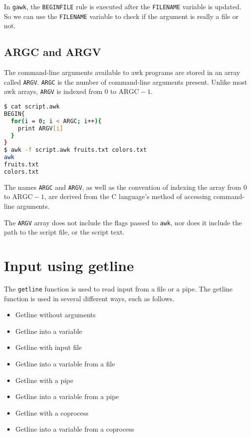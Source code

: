 In \lstinline|gawk|, the \lstinline|BEGINFILE| rule is executed after the \lstinline|FILENAME| variable is updated.
So we can use the \lstinline|FILENAME| variable to check if the argument is really a file or not.

\subsection{ARGC and ARGV}

The command-line arguments available to awk programs are stored in an array called \lstinline|ARGV|.
\lstinline|ARGC| is the number of command-line arguments present.
Unlike most awk arrays, \lstinline|ARGV| is indexed from $0$ to $\text{ARGC} - 1$.

\begin{lstlisting}[language=bash]
$ cat script.awk
BEGIN{
  for(i = 0; i < ARGC; i++){
    print ARGV[i]
  }
}
$ awk -f script.awk fruits.txt colors.txt
awk
fruits.txt
colors.txt
\end{lstlisting}

The names \lstinline|ARGC| and \lstinline|ARGV|, as well as the convention of indexing the array from $0$ to $\text{ARGC} - 1$,
are derived from the C language's method of accessing command-line arguments.

\begin{remark}
  The \lstinline|ARGV| array does not include the flags passed to \lstinline|awk|,
  nor does it include the path to the script file, or the script text.
\end{remark}

\section{Input using getline}

The \lstinline|getline| function is used to read input from a file or a pipe.
The getline function is used in several different ways, such as follows.

\begin{itemize}
  \item Getline without arguments
  \item Getline into a variable
  \item Getline with input file
  \item Getline into a variable from a file
  \item Getline with a pipe
  \item Getline into a variable from a pipe
  \item Getline with a coprocess
  \item Getline into a variable from a coprocess
\end{itemize}

